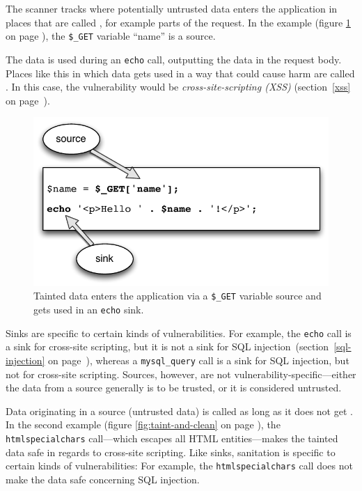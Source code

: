The scanner tracks where potentially untrusted data enters the application in places that are called , for example parts of the request. In the example (figure \ref{fig:taint} on page \pageref{fig:taint}), the \texttt{\$\_GET} variable ``name'' is a source.

The data is used during an \texttt{echo} call, outputting the data in the request body. Places like this in which data gets used in a way that could cause harm are called . In this case, the vulnerability would be \emph{cross-site-scripting (XSS)} (section~\ref{xss} on page~\pageref{xss}).

\begin{figure}[htb]
  \begin{center}
    \includegraphics[scale=0.75]{images/taint}
    \caption{Tainted data enters the application via a \texttt{\$\_GET} variable source and gets used in an \texttt{echo} sink.}
    \label{fig:taint}
  \end{center}
\end{figure}

Sinks are specific to certain kinds of vulnerabilities. For example, the \texttt{echo} call is a sink for cross-site scripting, but it is not a sink for SQL injection~(section~\ref{sql-injection} on page~\pageref{sql-injection}), whereas a \texttt{mysql\_query} call is a sink for SQL injection, but not for cross-site scripting. Sources, however, are not vulnerability-specific---either the data from a source generally is to be trusted, or it is considered untrusted.

Data originating in a source (\ie untrusted data) is called  as long as it does not get . In the second example (figure \ref{fig:taint-and-clean} on page \pageref{fig:taint-and-clean}), the \texttt{htmlspecialchars} call---which escapes all HTML entities---makes the tainted data safe in regards to cross-site scripting. Like sinks, sanitation is specific to certain kinds of vulnerabilities: For example, the \texttt{htmlspecialchars} call does not make the data safe concerning SQL injection.

